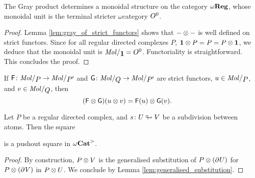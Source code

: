 \begin{cor} \label{cor:gray_prodcut_omegareg_monoidal}
    The Gray product determines a monoidal structure on the category \( \omega\mathbf{Reg} \), whose monoidal unit is the terminal stricter \( \omega \)\nbd category \( O^{0} \).
\end{cor}
\begin{proof}
    Lemma \ref{lem:gray_of_strict_functors} shows that \( - \otimes - \) is well defined on strict functors. 
    Since for all regular directed complexes \( P \), \( \mathbf{1} \otimes P = P = P \otimes \mathbf{1} \), we deduce that the monoidal unit is \( \molecin{\pt} = \globe{0} \).
    Functoriality is straightforward.
    This concludes the proof.
\end{proof}

\begin{rmk}
    If \( \F \colon \molecin{P} \to \molecin{P'} \) and \( \G \colon \molecin{Q} \to \molecin{P'} \) are strict functors, \( u \in \molecin{P} \), and \( v \in \molecin{Q} \), then 
    \begin{equation*}
       (\mathsf{F} \otimes \mathsf{G})(u \otimes v) = \mathsf{F}(u) \otimes \mathsf{G}(v). 
    \end{equation*}
\end{rmk}

\begin{lem} \label{lem:rewrite_condition_for_gray}
    Let \( P \) be a regular directed complex, and \( s \colon U \looparrowright V \) be a subdivision between atoms.
    Then the square
    \begin{center}
    \end{center}
    is a pushout square in \( {\omega\mathbf{Cat}}^> \).
\end{lem}
\begin{proof}
    By construction, \( P \otimes V \) is the generalised substitution of \( P \otimes (\partial_{}^{} U) \) for \( P \otimes (\partial_{}^{} V) \) in \( P \otimes U \).
    We conclude by Lemma \ref{lem:generalised_substitution}.
\end{proof}

